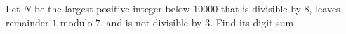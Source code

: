 Let $N$ be the largest positive integer below $10000$ that is divisible by $8$, leaves remainder $1$ modulo $7$, and is not divisible by $3$. Find its digit sum.
